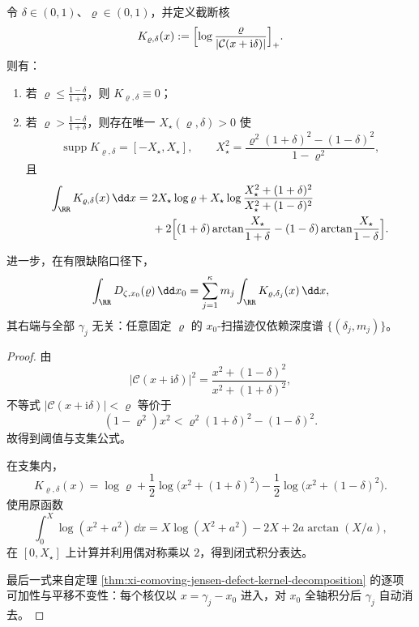 \begin{proposition}\label{prop:xi-finite-rho-scan-trace-closed-form-depth-only}
令 \(\delta\in(0,1)\)、\(\varrho\in(0,1)\)，并定义截断核
\[
K_{\varrho,\delta}(x):=\Bigl[\log\frac{\varrho}{|\mathcal C(x+\mathrm{i}\delta)|}\Bigr]_+.
\]
则有：
\begin{enumerate}
  \item 若 \(\varrho\le \frac{1-\delta}{1+\delta}\)，则 \(K_{\varrho,\delta}\equiv 0\)；
  \item 若 \(\varrho> \frac{1-\delta}{1+\delta}\)，则存在唯一 \(X_\star(\varrho,\delta)>0\) 使
  \[
  \operatorname{supp}K_{\varrho,\delta}=[-X_\star,X_\star],\qquad
  X_\star^2=\frac{\varrho^2(1+\delta)^2-(1-\delta)^2}{1-\varrho^2},
  \]
  且
  \begin{align*}
  \int_{\RR}K_{\varrho,\delta}(x)\,\dd x
  =&\ 2X_\star\log\varrho
  +X_\star\log\frac{X_\star^2+(1+\delta)^2}{X_\star^2+(1-\delta)^2}\\
  &\ +2\Bigl[(1+\delta)\arctan\!\frac{X_\star}{1+\delta}
  -(1-\delta)\arctan\!\frac{X_\star}{1-\delta}\Bigr].
  \end{align*}
\end{enumerate}
进一步，在有限缺陷口径下，
\[
\int_{\RR}D_{\zeta,x_0}(\varrho)\,\dd x_0
=\sum_{j=1}^{\kappa}m_j\int_{\RR}K_{\varrho,\delta_j}(x)\,\dd x,
\]
其右端与全部 \(\gamma_j\) 无关：任意固定 \(\varrho\) 的 \(x_0\)-扫描迹仅依赖深度谱 \(\{(\delta_j,m_j)\}\)。
\end{proposition}
\begin{proof}
由
\[
\bigl|\mathcal C(x+\mathrm{i}\delta)\bigr|^2
=\frac{x^2+(1-\delta)^2}{x^2+(1+\delta)^2},
\]
不等式 \(|\mathcal C(x+\mathrm{i}\delta)|<\varrho\) 等价于
\[
(1-\varrho^2)x^2<\varrho^2(1+\delta)^2-(1-\delta)^2.
\]
故得到阈值与支集公式。

在支集内，
\[
K_{\varrho,\delta}(x)
=\log\varrho+\frac12\log\bigl(x^2+(1+\delta)^2\bigr)-\frac12\log\bigl(x^2+(1-\delta)^2\bigr).
\]
使用原函数
\[
\int_0^X\log(x^2+a^2)\,\dd x
=X\log(X^2+a^2)-2X+2a\arctan(X/a),
\]
在 \([0,X_\star]\) 上计算并利用偶对称乘以 \(2\)，得到闭式积分表达。

最后一式来自定理 \ref{thm:xi-comoving-jensen-defect-kernel-decomposition} 的逐项可加性与平移不变性：每个核仅以 \(x=\gamma_j-x_0\) 进入，对 \(x_0\) 全轴积分后 \(\gamma_j\) 自动消去。
\end{proof}
